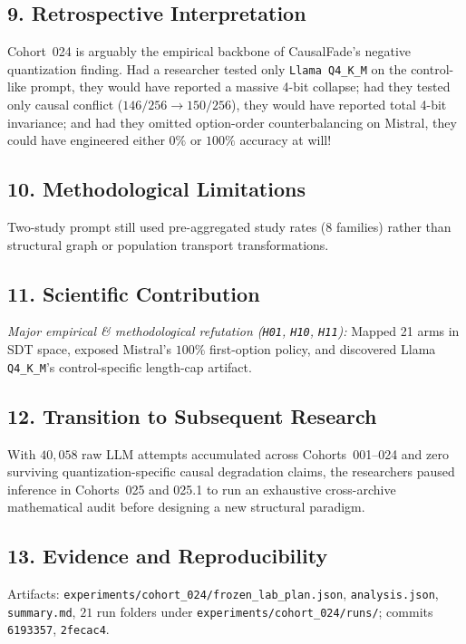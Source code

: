 \subsection*{9. Retrospective Interpretation}
Cohort~024 is arguably the empirical backbone of CausalFade's negative quantization finding. Had a researcher tested only \texttt{Llama Q4\_K\_M} on the control-like prompt, they would have reported a massive 4-bit collapse; had they tested only causal conflict ($146/256 \to 150/256$), they would have reported total 4-bit invariance; and had they omitted option-order counterbalancing on Mistral, they could have engineered either $0\%$ or $100\%$ accuracy at will!

\subsection*{10. Methodological Limitations}
Two-study prompt still used pre-aggregated study rates ($8$ families) rather than structural graph or population transport transformations.

\subsection*{11. Scientific Contribution}
\emph{Major empirical \& methodological refutation (\texttt{H01}, \texttt{H10}, \texttt{H11}):} Mapped 21 arms in SDT space, exposed Mistral's $100\%$ first-option policy, and discovered Llama \texttt{Q4\_K\_M}'s control-specific length-cap artifact.

\subsection*{12. Transition to Subsequent Research}
With $40{,}058$ raw LLM attempts accumulated across Cohorts~001--024 and zero surviving quantization-specific causal degradation claims, the researchers paused inference in Cohorts~025 and 025.1 to run an exhaustive cross-archive mathematical audit before designing a new structural paradigm.

\subsection*{13. Evidence and Reproducibility}
Artifacts: \texttt{experiments/cohort\_024/frozen\_lab\_plan.json}, \texttt{analysis.json}, \texttt{summary.md}, $21$ run folders under \texttt{experiments/cohort\_024/runs/}; commits \texttt{6193357}, \texttt{2fecac4}.

